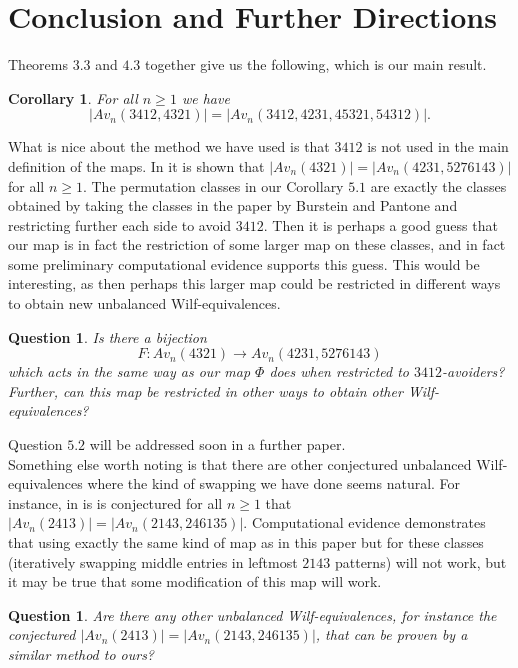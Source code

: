 \documentclass[11pt]{amsart}
\newtheorem{corollary}[theorem]{Corollary}
\newtheorem{question}[theorem]{Question}
\theoremstyle{remark}
\numberwithin{equation}{section}
\begin{document}
\section{Conclusion and Further Directions}
Theorems $3.3$ and $4.3$ together give us the following, which is our main result.
\begin{corollary}
For all $n\geq 1$ we have
    \[
    |Av_n(3412,4321)| = |Av_n(3412,4231,45321,54312)|.
    \]
\end{corollary} 
What is nice about the method we have used is that $3412$ is not used in the main definition of the maps. In \cite{BursteinPantone} it is shown that $|Av_n(4321)| = |Av_n(4231, 5276143)|$ for all $n\geq 1$. The permutation classes in our Corollary $5.1$ are exactly the classes obtained by taking the classes in the paper by Burstein and Pantone and restricting further each side to avoid $3412$. Then it is perhaps a good guess that our map is in fact the restriction of some larger map on these classes, and in fact some preliminary computational evidence supports this guess. This would be interesting, as then perhaps this larger map could be restricted in different ways to obtain new unbalanced Wilf-equivalences.
\begin{question}
Is there a bijection
\[
F: Av_n(4321) \rightarrow Av_n(4231, 5276143)
\]
which acts in the same way as our map $\Phi$ does when restricted to $3412$-avoiders? Further, can this map be restricted in other ways to obtain other Wilf-equivalences?
\end{question}
Question $5.2$ will be addressed soon in a further paper.
\\
Something else worth noting is that there are other conjectured unbalanced Wilf-equivalences where the kind of swapping we have done seems natural. For instance, in \cite{BursteinPantone} is is conjectured for all $n\geq 1$ that $|Av_n(2413)| = |Av_n(2143, 246135)|$. Computational evidence demonstrates that using exactly the same kind of map as in this paper but for these classes (iteratively swapping middle entries in leftmost $2143$ patterns) will not work, but it may be true that some modification of this map will work.
\begin{question}
    Are there any other unbalanced Wilf-equivalences, for instance the conjectured \cite{BursteinPantone} $|Av_n(2413)| = |Av_n(2143, 246135)|$, that can be proven by a similar method to ours?
\end{question}


\end{document}
